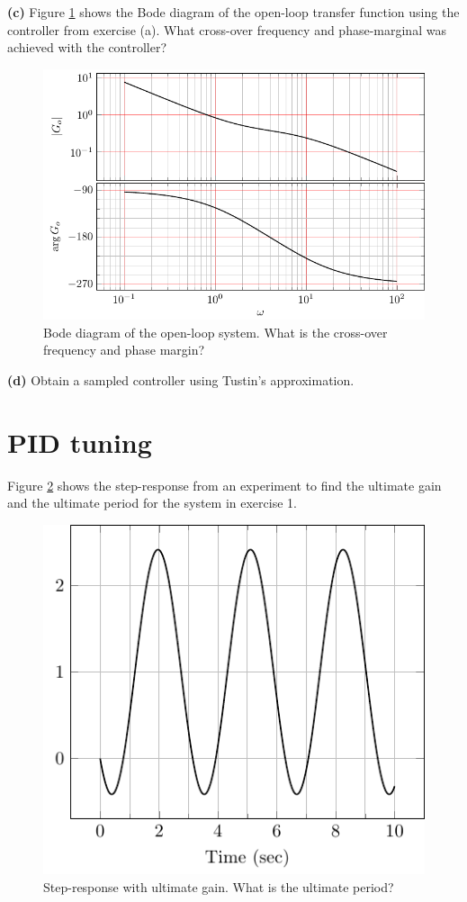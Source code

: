 \documentclass{scrartcl}
\begin{document}
  \textbf{(c)} Figure \ref{fig:nonminopen} shows the Bode diagram of the open-loop transfer function using the controller from exercise (a). What cross-over frequency and phase-marginal was achieved with the controller?
  \begin{figure}
  \begin{center}
  \includegraphics[width=0.8\linewidth]{bode-nonminopen}
  \end{center}
  \caption{Bode diagram of the open-loop system. What is the cross-over frequency and phase margin?}
  \label{fig:nonminopen}
  \end{figure}

  \textbf{(d)} Obtain a sampled controller using Tustin's approximation.
\section{PID tuning}
\label{sec-2}

  Figure \ref{fig:critical} shows the step-response from an experiment to find the ultimate gain and the ultimate period for the system in exercise 1.
  \begin{figure}
  \begin{center}
  \includegraphics[width=0.5\linewidth]{bode-nonmincritical}
  \end{center}
  \caption{Step-response with ultimate gain. What is the ultimate period?}
  \label{fig:critical}
  \end{figure}
\end{document}
